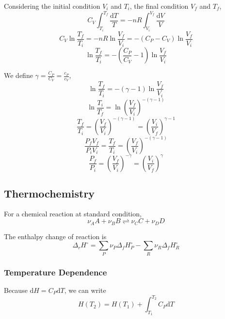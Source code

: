\documentclass[letterpaper]{article}
\newcommand{\diff}{\mathrm{d}}
\begin{document}
Considering the initial condition $V_i$ and $T_i$, the final condition $V_f$ and $T_f$,
\begin{equation*}
    C_V\int_{T_i}^{T_f}\frac{\diff T}{T}=-nR\int_{V_i}^{V_f}\frac{\diff V}{V}
\end{equation*}
\begin{equation*}
    C_V\ln\frac{T_f}{T_i}=-nR\ln\frac{V_f}{V_i}=-(C_P-C_V)\ln\frac{V_f}{V_i}
\end{equation*}
\begin{equation*}
    \ln\frac{T_f}{T_i}=-(\frac{C_P}{C_V}-1)\ln\frac{V_f}{V_i}
\end{equation*}

We define $\gamma=\frac{C_P}{C_V}=\frac{c_P}{c_V}$,
\begin{equation*}
    \ln\frac{T_f}{T_i}=-(\gamma-1)\ln\frac{V_f}{V_i}
\end{equation*}
\begin{equation*}
    \ln\frac{T_i}{T_f}=\ln(\frac{V_f}{V_i})^{-(\gamma-1)}
\end{equation*}
\begin{equation*}
    \frac{T_f}{T_i}=(\frac{V_f}{V_i})^{-(\gamma-1)}=(\frac{V_i}{V_f})^{\gamma-1}
\end{equation*}
\begin{equation*}
    \frac{P_fV_f}{P_iV_i}=\frac{T_f}{T_i}=(\frac{V_f}{V_i})^{-(\gamma-1)}
\end{equation*}
\begin{equation*}
    \boxed{\frac{P_f}{P_i}=(\frac{V_f}{V_i})^{-\gamma}=(\frac{V_i}{V_f})^\gamma}
\end{equation*}
\subsection*{Thermochemistry}
For a chemical reaction at standard condition,
\begin{equation*}
    \nu_AA+\nu_BB\rightleftharpoons\nu_CC+\nu_DD
\end{equation*}

The enthalpy change of reaction is
\begin{equation*}
    \Delta_rH^\circ=\sum_P\nu_P\Delta_fH^\circ_P-\sum_R\nu_R\Delta_fH^\circ_R
\end{equation*}

\subsubsection*{Temperature Dependence}
Because $\diff H=C_P\diff T$, we can write
\begin{equation*}
    H(T_2)=H(T_1)+\int_{T_1}^{T_2}C_P\diff T
\end{equation*}
\end{document}
